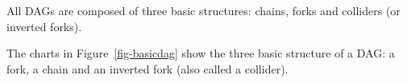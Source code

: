 \documentclass[
  super,
  preprint,
  3p]{elsarticle}
\begin{document}
All DAGs are composed of three basic structures: chains, forks and
colliders (or inverted forks).

The charts in Figure~\ref{fig-basicdag} show the three basic structure
of a DAG: a fork, a chain and an inverted fork (also called a collider).

\begin{figure}

\begin{minipage}[t]{0.07\linewidth}

{\centering 

~

}

\end{minipage}%
%
\begin{minipage}[t]{0.27\linewidth}

{\centering 


}

\end{minipage}%
%
\begin{minipage}[t]{0.07\linewidth}

{\centering 

~

}

\end{minipage}%
%
\begin{minipage}[t]{0.27\linewidth}


\end{minipage}
\end{figure}
\end{document}
